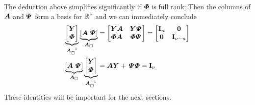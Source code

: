 The deduction above simplifies significantly if $\boldsymbol{\varPhi}$ is full rank: Then the columns of $\boldsymbol{A}$ and $\boldsymbol{\varPsi}$ form a basis for $\mathbb{R}^\nu$ and we can immediately conclude
\begin{subequations}
\begin{align}
 \underbrace{\begin{bmatrix} \kinBasisMat \\ \geoConstraintMat \end{bmatrix}}_{\kinMatSquare^{-1}} \underbrace{[\kinMat \ \InvGeoConstraintMat]}_{\kinMatSquare}
 &= \begin{bmatrix} \kinBasisMat \kinMat & \kinBasisMat\InvGeoConstraintMat\\ \geoConstraintMat\kinMat & \geoConstraintMat \InvGeoConstraintMat \end{bmatrix} 
 = \begin{bmatrix} \idMat[\dimConfigSpace] & \mat{0} \\ \mat{0} & \idMat[\numCoord-\dimConfigSpace] \end{bmatrix} 
\\
 \underbrace{[\kinMat \ \InvGeoConstraintMat]}_{\kinMatSquare}
 \underbrace{\begin{bmatrix} \kinBasisMat \\ \geoConstraintMat \end{bmatrix}}_{\kinMatSquare^{-1}}
 &= \kinMat \kinBasisMat +\, \InvGeoConstraintMat \geoConstraintMat
 = \idMat[\numCoord]
\end{align}
\end{subequations}
These identities will be important for the next sections. 

